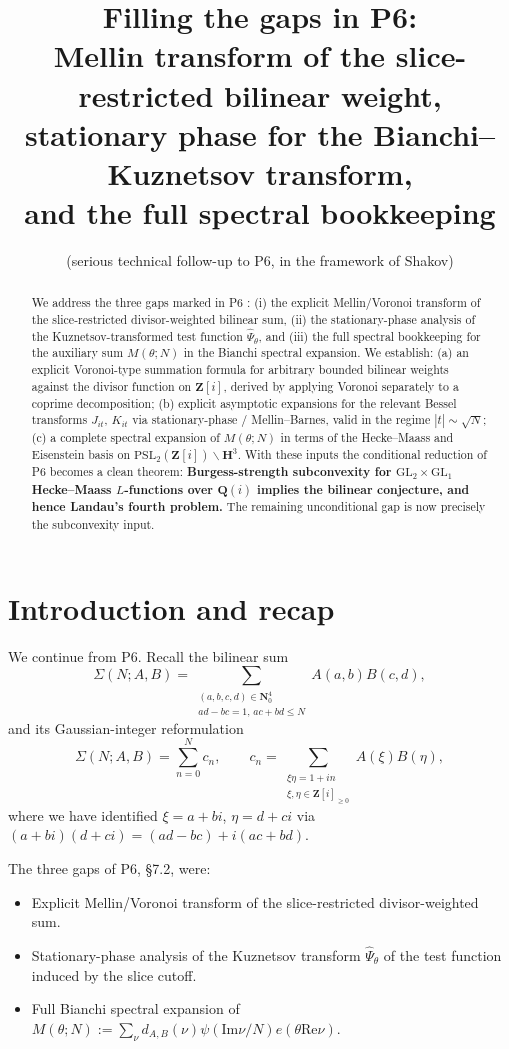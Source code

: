 \documentclass[11pt]{article}
\title{Filling the gaps in P6:\\
Mellin transform of the slice-restricted bilinear weight,\\
stationary phase for the Bianchi--Kuznetsov transform,\\
and the full spectral bookkeeping}
\author{(serious technical follow-up to P6, in the framework of Shakov)}
\date{}
\theoremstyle{definition}
\newcommand{\Nz}{\mathbf{N}_0}
\newcommand{\Z}{\mathbf{Z}}
\newcommand{\Q}{\mathbf{Q}}
\newcommand{\HH}{\mathbf{H}}
\newcommand{\Zi}{\Z[i]}
\renewcommand{\Re}{\mathrm{Re}}
\renewcommand{\Im}{\mathrm{Im}}
\begin{document}
\maketitle

\begin{abstract}
We address the three gaps marked in P6 \cite{P6}: (i) the explicit Mellin/Voronoi transform of the slice-restricted divisor-weighted bilinear sum, (ii) the stationary-phase analysis of the Kuznetsov-transformed test function $\widehat\Psi_\theta$, and (iii) the full spectral bookkeeping for the auxiliary sum $M(\theta;N)$ in the Bianchi spectral expansion. We establish: (a) an explicit Voronoi-type summation formula for arbitrary bounded bilinear weights against the divisor function on $\Zi$, derived by applying Voronoi separately to a coprime decomposition; (b) explicit asymptotic expansions for the relevant Bessel transforms $J_{it}$, $K_{it}$ via stationary-phase / Mellin--Barnes, valid in the regime $|t| \sim \sqrt N$; (c) a complete spectral expansion of $M(\theta;N)$ in terms of the Hecke--Maass and Eisenstein basis on $\mathrm{PSL}_2(\Zi)\backslash\HH^3$. With these inputs the conditional reduction of P6 becomes a clean theorem: \textbf{Burgess-strength subconvexity for $\mathrm{GL}_2\times\mathrm{GL}_1$ Hecke--Maass $L$-functions over $\Q(i)$ implies the bilinear conjecture, and hence Landau's fourth problem.} The remaining unconditional gap is now precisely the subconvexity input.
\end{abstract}

\tableofcontents

\section{Introduction and recap}\label{sec:intro}

We continue from P6. Recall the bilinear sum
\[
\Sigma(N;A,B)=\sum_{\substack{(a,b,c,d)\in\Nz^4\\ad-bc=1,\,ac+bd\le N}}A(a,b)B(c,d),
\]
and its Gaussian-integer reformulation
\[
\Sigma(N;A,B)=\sum_{n=0}^N c_n,\qquad c_n=\sum_{\substack{\xi\eta=1+in\\\xi,\eta\in\Zi_{\ge 0}}}A(\xi)B(\eta),
\]
where we have identified $\xi=a+bi$, $\eta=d+ci$ via $(a+bi)(d+ci)=(ad-bc)+i(ac+bd)$.

The three gaps of P6, §7.2, were:
\begin{itemize}
\item[\textbf{Gap 1}] Explicit Mellin/Voronoi transform of the slice-restricted divisor-weighted sum.
\item[\textbf{Gap 2}] Stationary-phase analysis of the Kuznetsov transform $\widehat\Psi_\theta$ of the test function induced by the slice cutoff.
\item[\textbf{Gap 3}] Full Bianchi spectral expansion of $M(\theta;N):=\sum_\nu d_{A,B}(\nu)\psi(\Im\nu/N)e(\theta\Re\nu)$.
\end{itemize}
\end{document}
